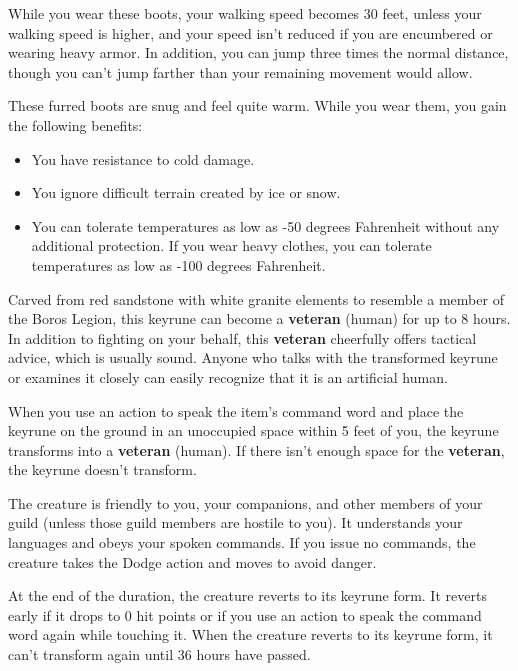 \documentclass[10pt,a4paper,twoside,bg=print,twocolumn,openany,nodeprecatedcode]{dndbook}
\begin{document}
While you wear these boots, your walking speed becomes 30 feet, unless your walking speed is higher, and your speed isn't reduced if you are encumbered or wearing heavy armor. In addition, you can jump three times the normal distance, though you can't jump farther than your remaining movement would allow.

These furred boots are snug and feel quite warm. While you wear them, you gain the following benefits:


\begin{itemize}
\item You have resistance to cold damage.
\item You ignore difficult terrain created by ice or snow.
\item You can tolerate temperatures as low as -50 degrees Fahrenheit without any additional protection. If you wear heavy clothes, you can tolerate temperatures as low as -100 degrees Fahrenheit.
\end{itemize}

Carved from red sandstone with white granite elements to resemble a member of the Boros Legion, this keyrune can become a \textbf{veteran} (human) for up to 8 hours. In addition to fighting on your behalf, this \textbf{veteran} cheerfully offers tactical advice, which is usually sound. Anyone who talks with the transformed keyrune or examines it closely can easily recognize that it is an artificial human.

When you use an action to speak the item's command word and place the keyrune on the ground in an unoccupied space within 5 feet of you, the keyrune transforms into a \textbf{veteran} (human). If there isn't enough space for the \textbf{veteran}, the keyrune doesn't transform.

The creature is friendly to you, your companions, and other members of your guild (unless those guild members are hostile to you). It understands your languages and obeys your spoken commands. If you issue no commands, the creature takes the Dodge action and moves to avoid danger.

At the end of the duration, the creature reverts to its keyrune form. It reverts early if it drops to 0 hit points or if you use an action to speak the command word again while touching it. When the creature reverts to its keyrune form, it can't transform again until 36 hours have passed.
\end{document}
